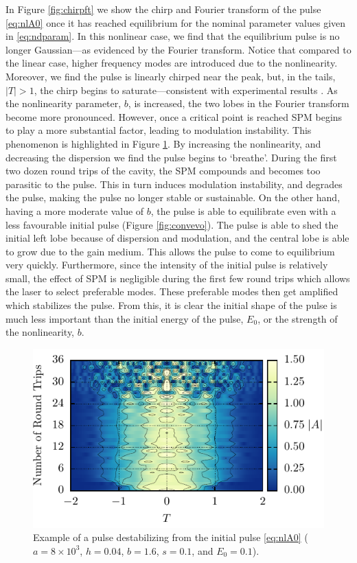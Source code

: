 \documentclass[10pt,twocolumn,a4paper]{article}
\begin{document}
In Figure \ref{fig:chirpft} we show the chirp and Fourier transform of the pulse \eqref{eq:nlA0} once it has reached equilibrium for the nominal parameter values given in \eqref{eq:ndparam}. In this nonlinear case, we find that the equilibrium pulse is no longer Gaussian---as evidenced by the Fourier transform. Notice that compared to the linear case, higher frequency modes are introduced due to the nonlinearity. Moreover, we find the pulse is linearly chirped near the peak, but, in the tails, $|T| > 1$, the chirp begins to saturate---consistent with experimental results \cite{chen2008, rothenberg1989b, tomlinson1985}. As the nonlinearity parameter, $b$, is increased, the two lobes in the Fourier transform become more pronounced. However, once a critical point is reached SPM begins to play a more substantial factor, leading to modulation instability. This phenomenon is highlighted in Figure \ref{fig:breakevo}. By increasing the nonlinearity, and decreasing the dispersion we find the pulse begins to `breathe'. During the first two dozen round trips of the cavity, the SPM compounds and becomes too parasitic to the pulse. This in turn induces modulation instability, and degrades the pulse, making the pulse no longer stable or sustainable. On the other hand, having a more moderate value of $b$, the pulse is able to equilibrate even with a less favourable initial pulse (Figure \ref{fig:convevo}). The pulse is able to shed the initial left lobe because of dispersion and modulation, and the central lobe is able to grow due to the gain medium. This allows the pulse to come to equilibrium very quickly. Furthermore, since the intensity of the initial pulse is relatively small, the effect of SPM is negligible during the first few round trips which allows the laser to select preferable modes. These preferable modes then get amplified which stabilizes the pulse. From this, it is clear the initial shape of the pulse is much less important than the initial energy of the pulse, $E_0$, or the strength of the nonlinearity, $b$.

\begin{figure}[tbp]
	\centering
	\includegraphics{Break}
	\caption{Example of a pulse destabilizing from the initial pulse \eqref{eq:nlA0} ($a = 8 \times 10^3$, $h = 0.04$, $b = 1.6$, $s = 0.1$, and $E_0 = 0.1$).}
	\label{fig:breakevo}
\end{figure}
\end{document}
